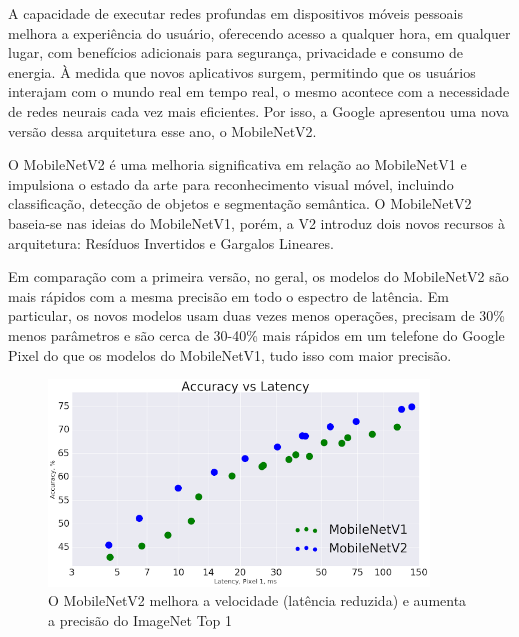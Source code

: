 
A capacidade de executar redes profundas em dispositivos móveis pessoais melhora a experiência do usuário, oferecendo acesso a qualquer hora, em qualquer lugar, com benefícios adicionais para segurança, privacidade e consumo de energia. À medida que novos aplicativos surgem, permitindo que os usuários interajam com o mundo real em tempo real, o mesmo acontece com a necessidade de redes neurais cada vez mais eficientes. Por isso, a Google apresentou uma nova versão dessa arquitetura esse ano, o MobileNetV2.


O MobileNetV2 é uma melhoria significativa em relação ao MobileNetV1 e impulsiona o estado da arte para reconhecimento visual móvel, incluindo classificação, detecção de objetos e segmentação semântica. O MobileNetV2 baseia-se nas ideias do MobileNetV1, porém, a V2 introduz dois novos recursos à arquitetura: Resíduos Invertidos e Gargalos Lineares.

Em comparação com a primeira versão, no geral, os modelos do MobileNetV2 são mais rápidos com a mesma precisão em todo o espectro de latência. Em particular, os novos modelos usam duas vezes menos operações, precisam de 30\% menos parâmetros e são cerca de 30-40\% mais rápidos em um telefone do Google Pixel do que os modelos do MobileNetV1, tudo isso com maior precisão.


\begin{figure}[!ht]
\centering 
\caption{O MobileNetV2 melhora a velocidade (latência reduzida) e aumenta a precisão do ImageNet Top 1}
\label{fig:mobilenetv1vsv2}
\includegraphics[width=0.9\textwidth]{imgs/mobilenetv1vsv2.png}
\end{figure}


